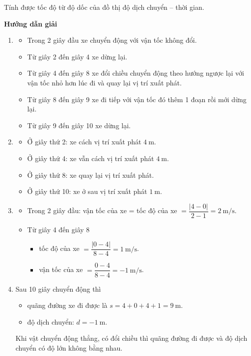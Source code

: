\begin{dang}{Tính được tốc độ từ độ dốc của đồ thị độ dịch chuyển – thời gian.}
{}
{\begin{center}
		\textbf{Hướng dẫn giải}
	\end{center}
\begin{enumerate}[label=\alph*)]
	\item \begin{itemize}
		\item Trong 2 giây đầu xe chuyển động với vận tốc không đổi.
		\item Từ giây 2 đến giây 4 xe dừng lại.
		\item Từ giây 4 đến giây 8 xe đổi chiều chuyển động theo hướng ngược lại với vận tốc nhỏ hơn lúc đi và quay lại vị trí xuất phát.
		\item Từ giây 8 đến giây 9 xe đi tiếp với vận tốc đó thêm 1 đoạn rồi mới dừng lại.
		\item Từ giây 9 đến giây 10 xe dừng lại.
	\end{itemize}
	\item \begin{itemize}
		\item Ở giây thứ 2: xe cách vị trí xuất phát $\SI{4}{\meter}$.
		\item Ở giây thứ 4: xe vẫn cách vị trí xuất phát $\SI{4}{\meter}$.
		\item Ở giây thứ 8: xe quay lại vị trí xuất phát.
		\item Ở giây thứ 10: xe ở sau vị trí xuất phát $\SI{1}{\meter}$.
	\end{itemize}
	\item \begin{itemize}
		\item Trong 2 giây đầu: vận tốc của xe = tốc độ của xe $=\dfrac{\left|4-0\right|}{2-1}=\SI{2}{\meter/\second}$.
		\item Từ giây 4 đến giây 8
		\begin{itemize}
			\item tốc độ của xe $=\dfrac{\left|0-4\right|}{8-4}=\SI{1}{\meter/\second}$.
			\item vận tốc của xe $=\dfrac{0-4}{8-4}=\SI{-1}{\meter/\second}$.
		\end{itemize}
	\end{itemize}
	\item Sau 10 giây chuyển động thì 
	\begin{itemize}
		\item quãng đường xe đi được là $s=4+0+4+1=\SI{9}{\meter}$.
		\item độ dịch chuyển: $d=\SI{-1}{\meter}$.
	\end{itemize}
	Khi vật chuyển động thẳng, có đổi chiều thì quãng đường đi được và độ dịch chuyển có độ lớn không bằng nhau.
\end{enumerate}
}
\end{dang}
